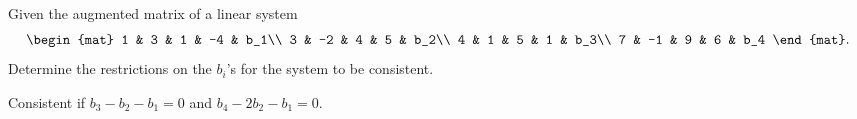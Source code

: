 
\begin{Exercise}[name={},
title={}, 
origin={\cite{YL}},
counter=Exercise]
Given the augmented matrix of a linear system
\[
\begin{mat}
1 & 3 & 1 & -4 & b_1\\
3 & -2 & 4 & 5 & b_2\\
4 & 1 & 5 &  1 & b_3\\
7 & -1 & 9 & 6 & b_4
\end{mat}.
\]
Determine the restrictions on the $b_i$'s for the system to be consistent.
\end{Exercise}

\begin{Answer}
Consistent if $b_3-b_2-b_1=0$ and $b_4-2b_2-b_1=0$.
\end{Answer}

